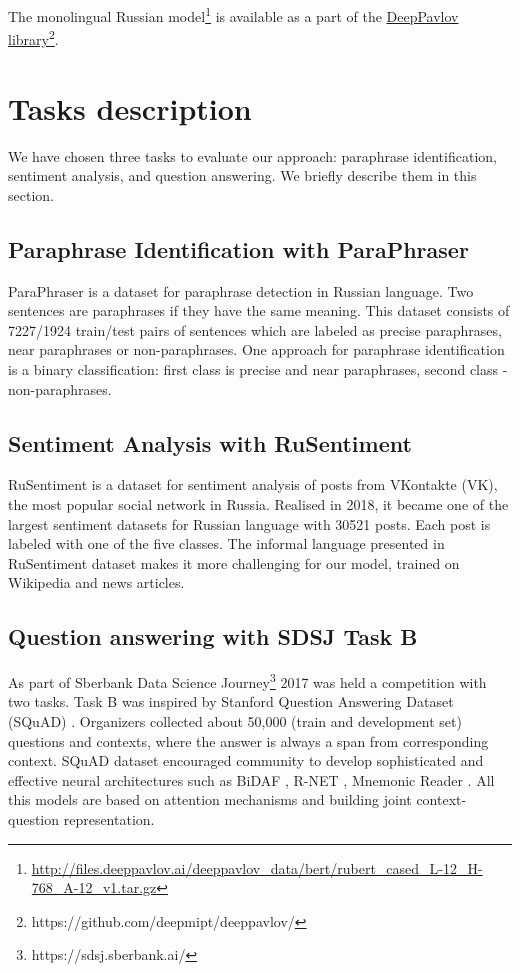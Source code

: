\documentclass{article}
\begin{document}
The monolingual Russian model\footnote{\url{http://files.deeppavlov.ai/deeppavlov_data/bert/rubert_cased_L-12_H-768_A-12_v1.tar.gz}} is available as a part of the \href{https://github.com/deepmipt/deeppavlov/}{DeepPavlov library}\footnote{https://github.com/deepmipt/deeppavlov/}.

\section{Tasks description}
We have chosen three tasks to evaluate our approach: paraphrase identification, sentiment analysis, and question answering. We briefly describe them in this section.

    \subsection{Paraphrase Identification with ParaPhraser}
    ParaPhraser \cite{pivovarova2017paraphraser} is a dataset for paraphrase detection in Russian language. Two sentences are paraphrases if they have the same meaning. This dataset consists of 7227/1924 train/test pairs of sentences which are labeled as precise paraphrases, near paraphrases or non-paraphrases. One approach for paraphrase identification is a binary classification: first class is precise and near paraphrases, second class - non-paraphrases.
    
    \subsection{Sentiment Analysis with RuSentiment}
    RuSentiment \cite{rogers2018rusentiment} is a dataset for sentiment analysis of posts from VKontakte (VK), the most popular social network in Russia. Realised in 2018, it became one of the largest sentiment datasets for Russian language with 30521 posts. Each post is labeled with one of the five classes. The informal language presented in RuSentiment dataset makes it more challenging for our model, trained on Wikipedia and news articles.
    
    \subsection{Question answering with SDSJ Task B}
    As part of Sberbank Data Science Journey\footnote{https://sdsj.sberbank.ai/} 2017 was held a competition with two tasks. Task B was inspired by Stanford Question Answering Dataset (SQuAD) \cite{rajpurkar2016squad}. Organizers collected about 50,000 (train and development set) questions and contexts, where the answer is always a span from corresponding context. SQuAD dataset encouraged community to develop sophisticated and effective neural architectures such as BiDAF \cite{seo2016bidirectional}, R-NET \cite{wang2017gated}, Mnemonic Reader \cite{hu2017reinforced}. All this models are based on attention mechanisms \cite{bahdanau2014neural,luong2015effective} and building joint context-question representation.
\end{document}
